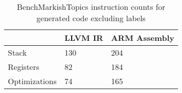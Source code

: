 \begin{table}[h!]
\centering
\begin{tabular}{p{}p{}p{}}
  \hline
 & LLVM IR & ARM Assembly \\ 
  \hline
Stack & 130 & 204 \\ 
  Registers &  82 & 184 \\ 
  Optimizations &  74 & 165 \\ 
   \hline
\end{tabular}
\caption{BenchMarkishTopics instruction counts for generated code excluding labels}
\end{table}
